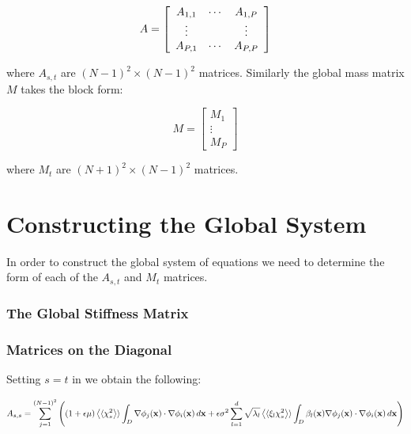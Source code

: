 \begin{equation}
    A = \left[\begin{array}{c c c}
        A_{1,1} & \cdots & A_{1,P} \\
        \vdots & & \vdots \\
        A_{P,1} & \cdots & A_{P,P}
    \end{array}\right]
\end{equation}

where $A_{s,t}$ are $(N-1)^2 \times (N-1)^2$ matrices. Similarly the global
mass matrix $M$ takes the block form:

\begin{equation}
    M = \left[\begin{array}{c}
            M_1 \\ \vdots \\ M_P
    \end{array}\right]
\end{equation}

where $M_t$ are $(N+1)^2 \times (N-1)^2$ matrices.

\section{Constructing the Global System}

In order to construct the global system of equations we need to determine the
form of each of the $A_{s,t}$ and $M_t$ matrices.

\subsubsection{The Global Stiffness Matrix}

\subsubsection{Matrices on the Diagonal}

Setting $s = t$ in  we obtain the following:

\begin{equation}
    A_{s,s} = \sum_{j=1}^{(N-1)^2}\left(
(1 + \epsilon\mu)\left\langle\langle\chi_s^2\right\rangle\rangle
      \int_D\nabla\phi_j(\mathbf{x})\cdot\nabla\phi_i(\mathbf{x})\, d\mathbf{x} +
      \epsilon\sigma^2\sum_{l=1}^d\sqrt{\lambda_l}\left\langle\langle\xi_l\chi_s^2\right\rangle\rangle
      \int_D\beta_l(\mathbf{x})\nabla\phi_j(\mathbf{x})\cdot\nabla\phi_i(\mathbf{x})\, d\mathbf{x}
      \right)
\end{equation}

